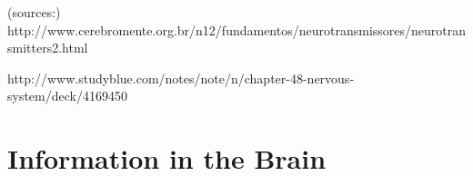 \documentclass{beamer}
\begin{document}
\begin{frame}

\vfill
\fontsize{6pt}{6pt}\selectfont 
(sources:) http://www.cerebromente.org.br/n12/fundamentos/neurotransmissores/neurotransmitters2.html

http://www.studyblue.com/notes/note/n/chapter-48-nervous-system/deck/4169450

\end{frame}

















\section{Information in the Brain}
\end{document}
